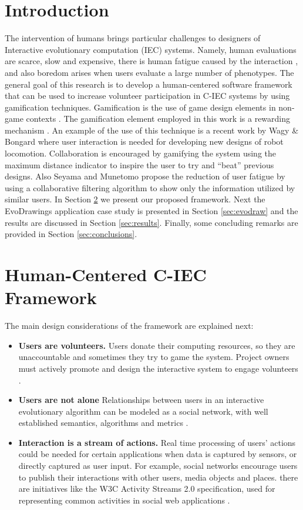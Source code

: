 \section{Introduction}

The intervention of humans brings particular challenges
to designers of Interactive evolutionary computation (IEC) systems.
Namely, human evaluations are scarce, slow and expensive, there is human 
fatigue caused by the interaction \cite{ie1}, and
also boredom arises when users evaluate a large number of phenotypes.
The general goal of this research is to develop a  human-centered 
\cite{gasson2003human} software framework that can be used to 
increase volunteer participation in C-IEC systems by using gamification techniques.
Gamification is the use of game design elements in non-game contexts \cite{deterding2011game}. 
The gamification element employed in this work is a rewarding mechanism
\cite{dubois2013understanding}. An example of the use of this technique is a recent
work by Wagy \& Bongard \cite{wagy2014collective} where user interaction is
needed for developing new designs of robot locomotion.
Collaboration is encouraged by gamifying the system using the maximum distance
indicator to inspire the user to try and ``beat'' previous designs. Also Seyama and
Munetomo \cite{seyama2016development} propose the reduction of user
fatigue by using a collaborative filtering algorithm to show only the
information utilized by similar users. In Section \ref{sec:framework}
we present our proposed framework. Next the EvoDrawings application case study 
is presented in Section \ref{sec:evodraw} and the
results are discussed in Section \ref{sec:results}. Finally, some concluding
remarks are provided in Section \ref{sec:conclusions}.

\section{Human-Centered C-IEC Framework}
\label{sec:framework} 
The main design considerations of the framework are explained next: 
\begin{itemize}
\item {\bf Users are volunteers.} Users donate their computing resources, so they are 
unaccountable and sometimes they try to game the system. Project owners must actively promote and
design the interactive system to engage volunteers \cite{oh2015clicking}. %
\item {\bf Users are not alone}
  Relationships between users in an interactive evolutionary algorithm can be modeled
  as a social network, with well established semantics, algorithms and metrics 
  \cite{ahuja1993network}. 
\item {\bf Interaction is a stream of actions.}
  Real time processing of users' actions could be needed for certain applications when data is 
  captured by sensors, or directly captured as user input. For example, social networks encourage
  users to publish their interactions with other users, media objects and places.
  there are initiatives like the W3C Activity Streams 2.0  specification, used for 
  representing common activities in social web applications \cite{json:streams}. 
\end{itemize}

